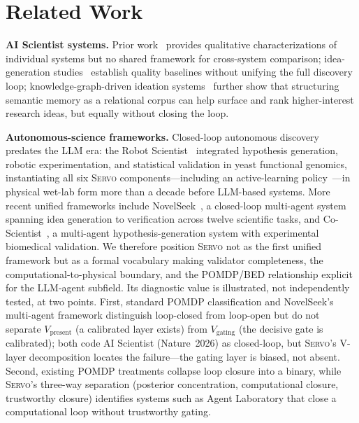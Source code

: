 \documentclass{article}
\newcommand{\framework}{\textsc{Servo}}
\begin{document}
\section{Related Work}
\label{sec:related}

\textbf{AI Scientist systems.} Prior work~\citep{lu2024aiscientist,lu2026aiscientist,schmidgall2025agentlab,boiko2023emergent} provides qualitative characterizations of individual systems but no shared framework for cross-system comparison; idea-generation studies~\citep{si2024novelideas,baek2024researchagent} establish quality baselines without unifying the full discovery loop; knowledge-graph-driven ideation systems~\citep{gu2024scimuse,lee2025spacer} further show that structuring semantic memory as a relational corpus can help surface and rank higher-interest research ideas, but equally without closing the loop.

\textbf{Autonomous-science frameworks.} Closed-loop autonomous discovery predates the LLM era: the Robot Scientist~\citep{sparkes2010robot} integrated hypothesis generation, robotic experimentation, and statistical validation in yeast functional genomics, instantiating all six \framework{} components---including an active-learning policy~\citep{king2004robot}---in physical wet-lab form more than a decade before LLM-based systems. More recent unified frameworks include NovelSeek~\citep{zhang2025novelseek}, a closed-loop multi-agent system spanning idea generation to verification across twelve scientific tasks, and Co-Scientist~\citep{gottweis2026coscientist}, a multi-agent hypothesis-generation system with experimental biomedical validation. We therefore position \framework{} not as the first unified framework but as a formal vocabulary making validator completeness, the computational-to-physical boundary, and the POMDP/BED relationship explicit for the LLM-agent subfield. Its diagnostic value is illustrated, not independently tested, at two points. First, standard POMDP classification and NovelSeek's multi-agent framework distinguish loop-closed from loop-open but do not separate $V_\text{present}$ (a calibrated layer exists) from $V_\text{gating}$ (the decisive gate is calibrated); both code AI Scientist (Nature~2026) as closed-loop, but \framework{}'s V-layer decomposition locates the failure---the gating layer is biased, not absent. Second, existing POMDP treatments collapse loop closure into a binary, while \framework{}'s three-way separation (posterior concentration, computational closure, trustworthy closure) identifies systems such as Agent Laboratory that close a computational loop without trustworthy gating.
\end{document}
